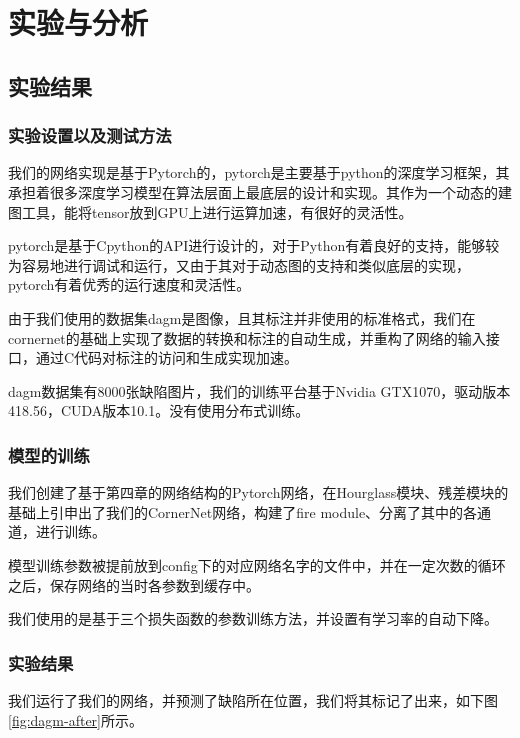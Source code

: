 \chapter{实验与分析}
\section{实验结果}
\subsection{实验设置以及测试方法}
我们的网络实现是基于Pytorch的，pytorch是主要基于python的深度学习框架，其承担着很多深度学习模型在算法层面上最底层的设计和实现。其作为一个动态的建图工具，能将tensor放到GPU上进行运算加速，有很好的灵活性。

pytorch是基于Cpython的API进行设计的，对于Python有着良好的支持，能够较为容易地进行调试和运行，又由于其对于动态图的支持和类似底层的实现，pytorch有着优秀的运行速度和灵活性。

由于我们使用的数据集dagm是图像，且其标注并非使用的标准格式，我们在cornernet的基础上实现了数据的转换和标注的自动生成，并重构了网络的输入接口，通过C代码对标注的访问和生成实现加速。

dagm数据集有8000张缺陷图片，我们的训练平台基于Nvidia GTX1070，驱动版本418.56，CUDA版本10.1。没有使用分布式训练。

\subsection{模型的训练}
我们创建了基于第四章的网络结构的Pytorch网络，在Hourglass模块、残差模块的基础上引申出了我们的CornerNet网络，构建了fire module、分离了其中的各通道，进行训练。

模型训练参数被提前放到config下的对应网络名字的文件中，并在一定次数的循环之后，保存网络的当时各参数到缓存中。

我们使用的是基于三个损失函数的参数训练方法，并设置有学习率的自动下降。

\subsection{实验结果}

我们运行了我们的网络，并预测了缺陷所在位置，我们将其标记了出来，如下图\ref{fig:dagm-after}所示。

